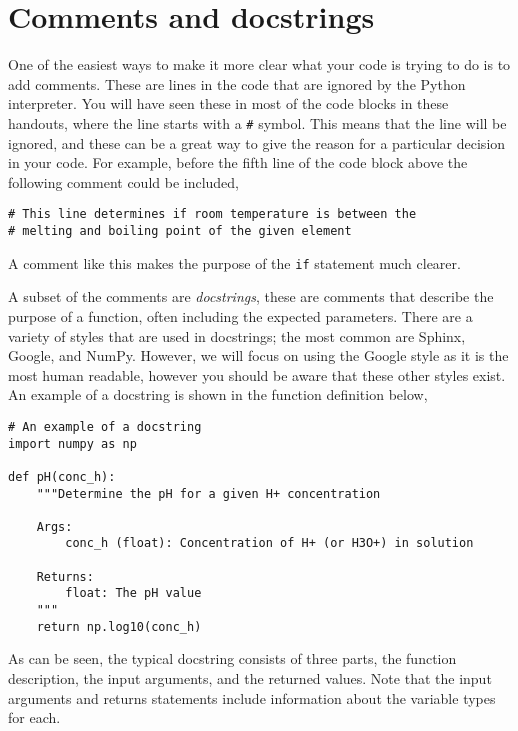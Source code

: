 \documentclass[a4paper]{article}
\begin{document}
\vspace{\baselineskip}
\begin{center}
	\noindent{}
\end{center}

\section{Comments and docstrings}
One of the easiest ways to make it more clear what your code is trying to do is to add comments.
These are lines in the code that are ignored by the Python interpreter.
You will have seen these in most of the code blocks in these handouts, where the line starts with a \texttt{\#} symbol.
This means that the line will be ignored, and these can be a great way to give the reason for a particular decision in your code.
For example, before the fifth line of the code block above the following comment could be included,
\begin{lstlisting}
# This line determines if room temperature is between the
# melting and boiling point of the given element
\end{lstlisting}
A comment like this makes the purpose of the \texttt{if} statement much clearer.

A subset of the comments are \emph{docstrings}, these are comments that describe the purpose of a function, often including the expected parameters.
There are a variety of styles that are used in docstrings; the most common are Sphinx, Google, and NumPy.
However, we will focus on using the Google style as it is the most human readable, however you should be aware that these other styles exist.
An example of a docstring is shown in the function definition below,
\begin{lstlisting}
# An example of a docstring
import numpy as np

def pH(conc_h):
    """Determine the pH for a given H+ concentration

    Args:
        conc_h (float): Concentration of H+ (or H3O+) in solution

    Returns:
        float: The pH value
    """
    return np.log10(conc_h)
\end{lstlisting}
As can be seen, the typical docstring consists of three parts, the function description, the input arguments, and the returned values.
Note that the input arguments and returns statements include information about the variable types for each.
\end{document}

